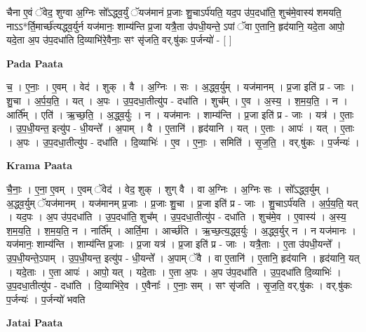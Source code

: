\documentclass[17pt]{extarticle}
\begin{document}
चैना ए॒वं ॅवेद॒ शुग्वा अ॒ग्निः सो᳚ऽद्ध्व॒र्युं ॅयज॑मानं प्र॒जाः शु॒चाऽर्प॑यति॒ यद॒प उ॑प॒दधा॑ति॒ शुच॑मे॒वास्य॑ शमयति॒ नाऽऽ*र्ति॒मार्च्छ॑त्यद्ध्व॒र्युर्न यज॑मानः॒ शाम्य॑न्ति प्र॒जा यत्रै॒ता उ॑पधी॒यन्ते॒ ऽपां ॅवा ए॒तानि॒ हृद॑यानि॒ यदे॒ता आपो॒ यदे॒ता अ॒प उ॑प॒दधा॑ति दि॒व्याभि॑रे॒वैनाः॒ सꣳ सृ॑जति॒ वर्.षु॑कः प॒र्जन्यो॑ - [  ] \newline

\textbf{Pada Paata} \newline

च॒ । ए॒नाः॒ । ए॒वम् । वेद॑ । शुक् । वै । अ॒ग्निः । सः । अ॒द्ध्व॒र्युम् । यज॑मानम् । प्र॒जा इति॑ प्र - जाः । शु॒चा । अ॒र्प॒य॒ति॒ । यत् । अ॒पः । उ॒प॒दधा॒तीत्यु॑प - दधा॑ति । शुच᳚म् । ए॒व । अ॒स्य॒ । श॒म॒य॒ति॒ । न । आर्ति᳚म् । एति॑ । ऋ॒च्छ॒ति॒ । अ॒द्ध्व॒र्युः । न । यज॑मानः । शाम्य॑न्ति । प्र॒जा इति॑ प्र - जाः । यत्र॑ । ए॒ताः । उ॒प॒धी॒यन्त॒ इत्यु॑प - धी॒यन्ते᳚ । अ॒पाम् । वै । ए॒तानि॑ । हृद॑यानि । यत् । ए॒ताः । आपः॑ । यत् । ए॒ताः । अ॒पः । उ॒प॒दधा॒तीत्यु॑प - दधा॑ति । दि॒व्याभिः॑ । ए॒व । ए॒नाः॒ । समिति॑ । सृ॒ज॒ति॒ । वर्.षु॑कः । प॒र्जन्यः॑ ।  \newline


\textbf{Krama Paata} \newline

चै॒नाः॒ । ए॒ना॒ ए॒वम् । ए॒वम् ॅवेद॑ । वेद॒ शुक् । शुग् वै । वा अ॒ग्निः । अ॒ग्निः सः । सो᳚ऽद्ध्व॒र्युम् । अ॒द्ध्व॒र्युम् ॅयज॑मानम् । यज॑मानम् प्र॒जाः । प्र॒जाः शु॒चा । प्र॒जा इति॑ प्र - जाः । शु॒चाऽर्प॑यति । अ॒र्प॒य॒ति॒ यत् । यद॒पः । अ॒प उ॑प॒दधा॑ति । उ॒प॒दधा॑ति॒ शुच᳚म् । उ॒प॒दधा॒तीत्यु॑प - दधा॑ति । शुच॑मे॒व । ए॒वास्य॑ । अ॒स्य॒ श॒म॒य॒ति॒ । श॒म॒य॒ति॒ न । नार्ति᳚म् । आर्ति॒मा । आर्च्छ॑ति । ऋ॒च्छ॒त्य॒द्ध्व॒र्युः । अ॒द्ध्व॒र्युर् न । न यज॑मानः । यज॑मानः॒ शाम्य॑न्ति । शाम्य॑न्ति प्र॒जाः । प्र॒जा यत्र॑ । प्र॒जा इति॑ प्र - जाः । यत्रै॒ताः । ए॒ता उ॑पधी॒यन्ते᳚ । उ॒प॒धी॒यन्ते॒ऽपाम् । उ॒प॒धी॒यन्त॒ इत्यु॑प - धी॒यन्ते᳚ । अ॒पाम् ॅवै । वा ए॒तानि॑ । ए॒तानि॒ हृद॑यानि । हृद॑यानि॒ यत् । यदे॒ताः । ए॒ता आपः॑ । आपो॒ यत् । यदे॒ताः । ए॒ता अ॒पः । अ॒प उ॑प॒दधा॑ति । उ॒प॒दधा॑ति दि॒व्याभिः॑ । उ॒प॒दधा॒तीत्यु॑प - दधा॑ति । दि॒व्याभि॑रे॒व । ए॒वैनाः᳚ । ए॒नाः॒ सम् । सꣳ सृ॑जति । सृ॒ज॒ति॒ वर्.षु॑कः । वर्.षु॑कः प॒र्जन्यः॑ । प॒र्जन्यो॑ भवति \newline

\textbf{Jatai Paata} \newline
\end{document}
